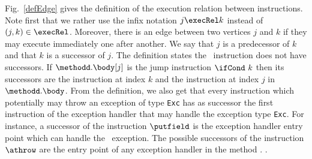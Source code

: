  Fig.\ \ref{defEdge} gives the definition of  the execution relation between instructions.
Note first that we rather use the infix notation $j \execRel k$ instead of $(j, k) \in \execRel$.
 Moreover, there is an edge between two vertices $j$ and  $k$ if they may execute immediately one after another.
 We say that $j$ is a predecessor of $k$ and that  $k$ is a successor of  $j$.
 The definition states the \return \  instruction  does not have successors.
If  $\methodd.\body[j ]$ is the jump instruction $ \ifCond \ k $ then  its successors are the instruction at index $k$   and the instruction at index $j$ in $\methodd.\body$.
From the definition, we also get that every instruction which potentially may throw an exception of type \texttt{Exc}
has as successor the first instruction of the exception handler that may handle the exception type \texttt{Exc}. For instance, a successor
of the instruction $\putfield$ is the exception handler entry point which can handle  the \NullPointerExc \ exception. 
The possible successors of the instruction $\athrow$ are the entry point of any  exception handler  in the method \methodd.
.
